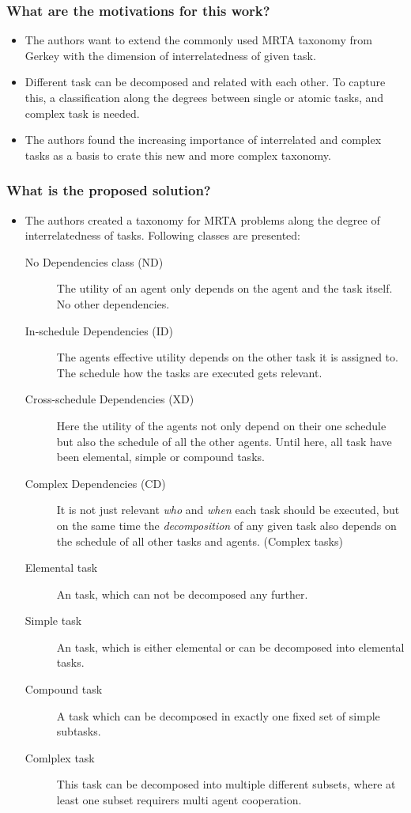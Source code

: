      
    \subsubsection*{What are the motivations for this work?}
    \begin{itemize}
        \item The authors want to extend the commonly used MRTA taxonomy from Gerkey \cite{Gerkey2004} with the dimension of interrelatedness of given task. 
        \item Different task can be decomposed and related with each other. To capture this, a classification along the degrees between single or atomic tasks, and complex task is needed.
        \item The authors found the increasing importance of interrelated and complex tasks as a basis to crate this new and more complex taxonomy.
    \end{itemize}
    \subsubsection*{What is the proposed solution?}
    \begin{itemize}
      \item The authors created a taxonomy for MRTA problems along the degree of interrelatedness of tasks. Following classes are presented: \ 
      \begin{description}
          \item[No Dependencies class (ND)] The utility of an agent only depends on the agent and the task itself. No other dependencies. 
          \item[In-schedule Dependencies (ID)] The agents effective utility depends on the other task it is assigned to. The schedule how the tasks are executed gets relevant.
          \item[Cross-schedule Dependencies (XD)] Here the utility of the agents not only depend on their one schedule but also the schedule of all the other agents. Until here, all task have been elemental, simple or compound tasks.
          \item[Complex Dependencies (CD)] It is not just relevant \emph{who} and \emph{when} each task should be executed, but on the same time the \emph{decomposition} of any given task also depends on the schedule of all other tasks and agents. (Complex tasks)
          \item[Elemental task]  An task, which can not be decomposed any further.
          \item[Simple task]  An task, which is either elemental or can be decomposed into elemental tasks.
          \item[Compound task] A task which can be decomposed in exactly one fixed set of simple subtasks.
          \item[Comlplex task] This task can be decomposed into multiple different subsets, where at least one subset requirers multi agent cooperation.
      \end{description}
    \end{itemize}
